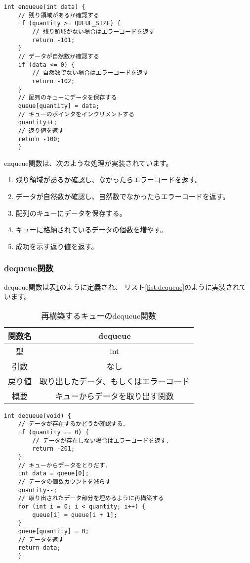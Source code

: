 \documentclass[a4j]{jarticle}
\begin{document}
\begin{lstlisting}[caption=再構築するキューのenqueue関数の実装,label=list:enqueue]
    int enqueue(int data) {
    // 残り領域があるか確認する
    if (quantity >= QUEUE_SIZE) {
        // 残り領域がない場合はエラーコードを返す
        return -101;
    }
    // データが自然数か確認する
    if (data <= 0) {
        // 自然数でない場合はエラーコードを返す
        return -102;
    }
    // 配列のキューにデータを保存する
    queue[quantity] = data;
    // キューのポインタをインクリメントする
    quantity++;
    // 返り値を返す
    return -100;
    }
\end{lstlisting}
enqueue関数は、次のような処理が実装されています。
\begin{enumerate}
  \item 残り領域があるか確認し、なかったらエラーコードを返す。
  \item データが自然数か確認し、自然数でなかったらエラーコードを返す。
  \item 配列のキューにデータを保存する。
  \item キューに格納されているデータの個数を増やす。
  \item 成功を示す返り値を返す。
\end{enumerate}

\subsubsection{dequeue関数}
dequeue関数は表\ref{table:dequeue}のように定義され、
リスト\ref{list:dequeue}のように実装されています。

\newpage

\begin{table}[htbp]
  \centering
  \caption{再構築するキューのdequeue関数}
  \label{table:dequeue}
  \begin{tabular}{|c|c|}
    \hline
    関数名 & dequeue             \\
    \hline
    型   & int                 \\
    \hline
    引数  & なし                  \\
    \hline
    戻り値 & 取り出したデータ、もしくはエラーコード \\
    \hline
    概要  & キューからデータを取り出す関数     \\
    \hline
  \end{tabular}
\end{table}

\begin{lstlisting}[caption=再構築するキューのdequeue関数の実装,label=list:dequeue]
    int dequeue(void) {
    // データが存在するかどうか確認する．
    if (quantity == 0) {
        // データが存在しない場合はエラーコードを返す．
        return -201;
    }
    // キューからデータをとりだす．
    int data = queue[0];
    // データの個数カウントを減らす
    quantity--;
    // 取り出されたデータ部分を埋めるように再構築する
    for (int i = 0; i < quantity; i++) {
        queue[i] = queue[i + 1];
    }
    queue[quantity] = 0;
    // データを返す
    return data;
    }
\end{lstlisting}
\end{document}
